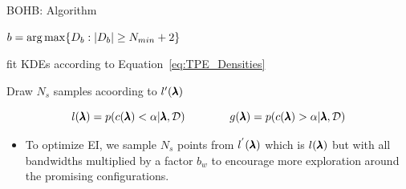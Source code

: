 \begin{frame}{BOHB: Algorithm}

\begin{algorithm}[H]
    \LinesNumbered
    \SetAlgoLined
    \setcounter{AlgoLine}{0}
    \DeclarePairedDelimiter\ceil{\lceil}{\rceil}
    \DeclarePairedDelimiter\floor{\lfloor}{\rfloor}
    \DeclarePairedDelimiter\abs{\lvert}{\rvert}
    
    $b=\operatorname*{arg\,max} \{D_b:\lvert D_b \rvert \geq N_{min}+2\}$
    
    
    fit KDEs according to Equation~\ref{eq:TPE_Densities}
    
    Draw $N_s$ samples acoording to $l'(\pmb{\lambda})$
    
    
   
 
        
    
    \caption{Pseudocode for sampling in BOHB}
\end{algorithm}
\vspace{-2em}
\begin{equation}
    l(\pmb{\lambda})=p(c({\pmb{\lambda}})<\alpha|\pmb{\lambda}, \mathcal{D})\quad\quad\quad\quad
    g(\pmb{\lambda})=p(c({\pmb{\lambda}})>\alpha|\pmb{\lambda}, \mathcal{D})
    \label{eq:TPE_Densities}
\end{equation}

\begin{itemize}
    \item To optimize EI, we sample $N_s$ points from $l^{'}(\pmb{\lambda})$ which is $l(\pmb{\lambda})$ but with all bandwidths multiplied by a factor $b_w$ to encourage more exploration around the promising configurations.
\end{itemize}

\end{frame}
